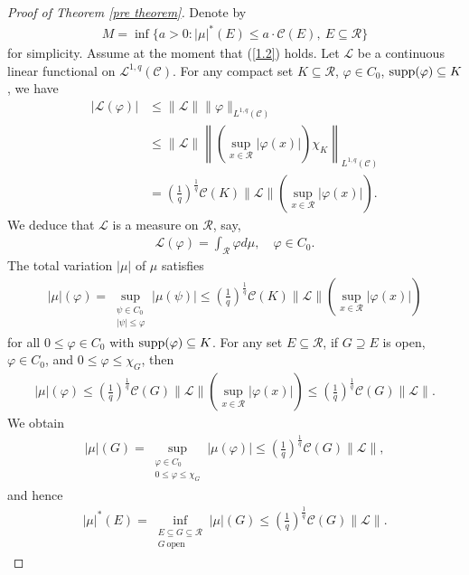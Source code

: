 \documentclass[10pt,reqno]{amsart}
\numberwithin{equation}{section}
\begin{document}
\begin{proof}[Proof of Theorem \ref{pre theorem}]
Denote by
\begin{align*}
M=\inf\{a>0: |\mu|^{\ast}(E)\leq a\cdot\mathcal{C}(E),~E\subseteq\mathcal{R}\}
\end{align*}
for simplicity. Assume at the moment that (\ref{1.2}) holds. Let $\mathcal{L}$ be a continuous linear functional on $\mathcal{L}^{1,q}(\mathcal{C})$. For any compact set $K\subseteq\mathcal{R}$, $\varphi\in C_{0}$, ${\rm supp}(\varphi)\subseteq K$, we have 
\begin{align*}
|\mathcal{L}(\varphi)|&\leq\|\mathcal{L}\|\|\varphi\|_{L^{1,q}(\mathcal{C})}\\
&\leq\|\mathcal{L}\|\left\|\left(\sup_{x\in\mathcal{R}}|\varphi(x)|\right)\chi_{K}\right\|_{L^{1,q}(\mathcal{C})}\\
&=\left(\frac{1}{q}\right)^{\frac{1}{q}}\mathcal{C}(K)\|\mathcal{L}\|\left(\sup_{x\in\mathcal{R}}|\varphi(x)|\right).
\end{align*}
We deduce that $\mathcal{L}$ is a measure on $\mathcal{R}$, say,
\begin{align*}
\mathcal{L}(\varphi)=\int_{\mathcal{R}}\varphi d\mu,\quad\varphi\in C_{0}.
\end{align*}
The total variation $|\mu|$ of $\mu$ satisfies 
\begin{align*}
|\mu|(\varphi)=\sup_{\substack{\psi\in C_{0}\\|\psi|\leq\varphi}}|\mu(\psi)|\leq\left(\frac{1}{q}\right)^{\frac{1}{q}}\mathcal{C}(K)\|\mathcal{L}\|\left(\sup_{x\in\mathcal{R}}|\varphi(x)|\right)
\end{align*}
for all $0\leq\varphi\in C_{0}$ with ${\rm supp}(\varphi)\subseteq K$. For any set $E\subseteq\mathcal{R}$, if $G\supseteq E$ is open, $\varphi\in C_{0}$, and $0\leq\varphi\leq\chi_{G}$, then
\begin{align*}
|\mu|(\varphi)\leq\left(\frac{1}{q}\right)^{\frac{1}{q}}\mathcal{C}(G)\|\mathcal{L}\|\left(\sup_{x\in\mathcal{R}}|\varphi(x)|\right)\leq\left(\frac{1}{q}\right)^{\frac{1}{q}}\mathcal{C}(G)\|\mathcal{L}\|.
\end{align*}
We obtain 
\begin{align*}
|\mu|(G)=\sup_{\substack{\varphi\in C_{0}\\0\leq\varphi\leq\chi_{G}}}|\mu(\varphi)|\leq\left(\frac{1}{q}\right)^{\frac{1}{q}}\mathcal{C}(G)\|\mathcal{L}\|,
\end{align*}
and hence 
\begin{align*}
|\mu|^{\ast}(E)=\inf_{\substack{E\subseteq G\subseteq\mathcal{R}\\ G~\text{open}}}|\mu|(G)\leq\left(\frac{1}{q}\right)^{\frac{1}{q}}\mathcal{C}(G)\|\mathcal{L}\|.

\end{align*}
\end{proof}
\end{document}
